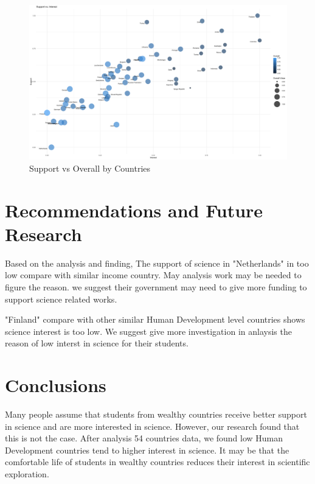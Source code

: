\documentclass[12pt]{article}
\begin{document}
\begin{figure}[htb]
  \centering
  \includegraphics[width=\linewidth]{images/interest_support_vs_overall}
  \caption{Support vs Overall by Countries}
  \label{fig:int_sup_overall}
\end{figure}

\section{Recommendations and Future Research}

Based on the analysis and finding, 
The support of science in "Netherlands" in too low compare with similar income country.
May analysis work may be needed to figure the reason. we suggest their government may need to give more funding to support science related works.

"Finland" compare with other similar Human Development level countries shows science interest is too low.
We suggest give more investigation in anlaysis the reason of low interst in science for their students.



\section{Conclusions}

Many people assume that students from wealthy countries receive better support in science and are more interested in science. However, our research found that this is not the case. 
After analysis 54 countries data, we found low Human Development countries tend to higher interest in science.
It may be that the comfortable life of students in wealthy countries reduces their interest in scientific exploration.
\end{document}
